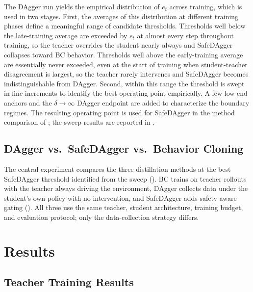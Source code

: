 The DAgger run yields the empirical distribution of $e_t$ across training, which is used in two stages.
First, the averages of this distribution at different training phases define a meaningful range of candidate thresholds.
Thresholds well below the late-training average are exceeded by $e_t$ at almost every step throughout training, so the teacher overrides the student nearly always and SafeDAgger collapses toward \ac{BC} behavior.
Thresholds well above the early-training average are essentially never exceeded, even at the start of training when student-teacher disagreement is largest, so the teacher rarely intervenes and SafeDAgger becomes indistinguishable from DAgger.
Second, within this range the threshold is swept in fine increments to identify the best operating point empirically.
A few low-end anchors and the $\delta \to \infty$ DAgger endpoint are added to characterize the boundary regimes.
The resulting operating point is used for SafeDAgger in the method comparison of ; the sweep results are reported in .

\subsection{DAgger vs.\ SafeDAgger vs.\ Behavior Cloning}%
\label{sec:ablation_method}%

The central experiment compares the three distillation methods at the best SafeDAgger threshold identified from the sweep ().
\ac{BC} trains on teacher rollouts with the teacher always driving the environment, DAgger collects data under the student's own policy with no intervention, and SafeDAgger adds safety-aware gating ().
All three use the same teacher, student architecture, training budget, and evaluation protocol; only the data-collection strategy differs.

\section{Results}%
\label{sec:results}%

\subsection{Teacher Training Results}%
\label{sec:teacher_results}%

